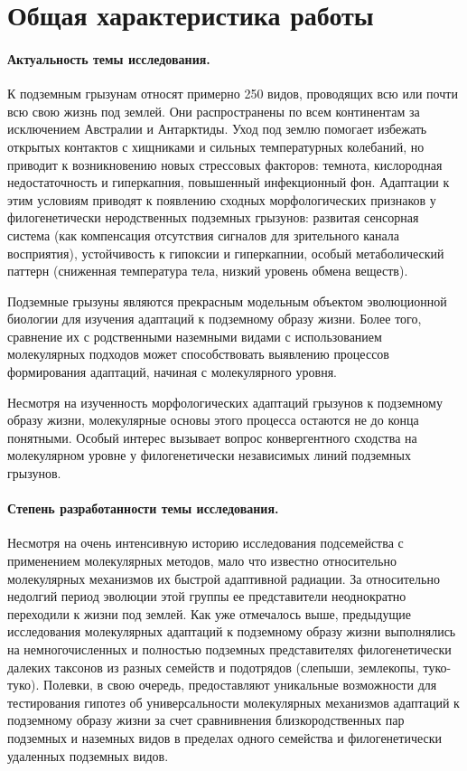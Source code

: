 \section*{Общая характеристика работы}

\paragraph{Актуальность темы исследования.} К подземным грызунам относят примерно 250 видов, проводящих всю или почти всю свою жизнь под землей. Они распространены по всем континентам за исключением Австралии и Антарктиды. Уход под землю помогает избежать открытых контактов с хищниками и сильных температурных колебаний, но приводит к возникновению новых стрессовых факторов: темнота, кислородная недостаточность и гиперкапния, повышенный инфекционный фон. Адаптации к этим условиям приводят к появлению сходных морфологических признаков у филогенетически неродственных подземных грызунов: развитая сенсорная система (как компенсация отсутствия сигналов для зрительного канала восприятия), устойчивость к гипоксии и гиперкапнии, особый метаболический паттерн (сниженная температура тела, низкий уровень обмена веществ). 

Подземные грызуны являются прекрасным модельным объектом эволюционной биологии для изучения адаптаций к подземному образу жизни. Более того, сравнение их с родственными наземными видами с использованием молекулярных подходов может способствовать выявлению процессов формирования адаптаций, начиная с молекулярного уровня. 

Несмотря на изученность морфологических адаптаций грызунов к подземному образу жизни, молекулярные основы этого процесса остаются не до конца понятными. Особый интерес вызывает вопрос конвергентного сходства на молекулярном уровне у филогенетически независимых линий подземных грызунов.

\paragraph{Степень разработанности темы исследования.} Несмотря на очень интенсивную историю исследования подсемейства с применением молекулярных методов, мало что известно относительно молекулярных механизмов их быстрой адаптивной радиации. За относительно недолгий период эволюции этой группы ее представители неоднократно переходили к жизни под землей. Как уже отмечалось выше, предыдущие исследования молекулярных адаптаций к подземному образу жизни выполнялись на немногочисленных и полностью подземных представителях филогенетически далеких таксонов из разных семейств и подотрядов (слепыши, землекопы, туко-туко). Полевки, в свою очередь, предоставляют уникальные возможности для тестирования гипотез об универсальности молекулярных механизмов адаптаций к подземному образу жизни за счет сравнивнения близкородственных пар подземных и наземных видов в пределах одного семейства и филогенетически удаленных подземных видов. 

